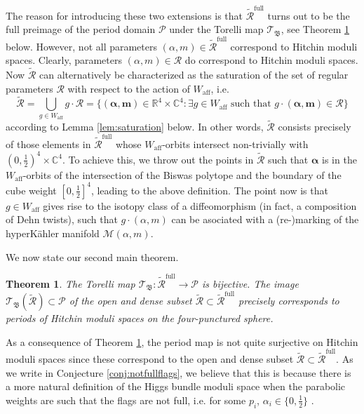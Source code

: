 \documentclass[12pt,letterpaper,reqno]{amsart}
\def\bm#1{#1}%
\def\mathbf#1{#1}%
\newtheorem{thm}{Theorem}
\theoremstyle{remark}
\theoremstyle{definition}
\numberwithin{thm}{section}
\numberwithin{equation}{section}
\numberwithin{figure}{section}
\newcommand{\fB}{{\mathfrak B}}
\newcommand{\cT}{\ensuremath{\mathcal T}}
\newcommand{\R}{\ensuremath{\mathbb R}}
\newcommand{\C}{\ensuremath{\mathbb C}}
\newcommand{\bfalpha}{\ensuremath{\bm \alpha}}
\newcommand{\calP}{\mathcal P}
\newcommand{\calM}{\mathcal M}
\newcommand{\aff}{\mathrm{aff}}
\newcommand{\bfm}{\mathbf{m}}
\begin{document}
The reason for introducing these two extensions is that $\widetilde{\mathcal{R}}^{\mathrm{full}}$ turns out to be the full preimage of the period domain $\mathcal{P}$ under the Torelli map $\mathcal{T}_\mathfrak{B}$, see Theorem \ref{thm:surjective} below. However, not all parameters $(\bfalpha, \bfm) \in \widetilde{\mathcal{R}}^{\mathrm{full}}$ correspond to Hitchin moduli spaces. Clearly, parameters $(\bfalpha, \bfm) \in \mathcal{R}$ do correspond to Hitchin moduli spaces. Now $\widetilde{\mathcal{R}}$ can alternatively be characterized as the saturation of the set of regular parameters $\mathcal{R}$ with respect to the action of $W_\aff$, i.e.\
\[
\widetilde{\mathcal{R}} = \bigcup_{g \in 	W_{\mathrm{aff}}} g \cdot \mathcal{R} = \bigl \{ (\boldsymbol{\alpha}, \textbf{m}) \in \R^4 \times \C^4 : \exists g \in W_{\mathrm{aff}} \mbox{ such that } g \cdot (\boldsymbol{\alpha}, \textbf{m}) \in \mathcal{R} \bigr\}
\]
according to Lemma \ref{lem:saturation} below. In other words, $\widetilde{\mathcal{R}}$ consists precisely of those elements in $\widetilde{\mathcal{R}}^{\mathrm{full}}$ whose $W_{\mathrm{aff}}$-orbits intersect non-trivially with $(0, \frac{1}{2})^4 \times \C^4$. To achieve this, we throw out the points in $\widetilde{\mathcal{R}}$ such that $\boldsymbol{\alpha}$ is in the $W_{\mathrm{aff}}$-orbits of the intersection of the Biswas polytope and the boundary of the cube weight $[ 0, \frac{1}{2}]^4$, leading to the above definition. The point now is that $g \in W_\aff$ gives rise to the isotopy class of a diffeomorphism (in fact, a composition of Dehn twists), such that $g \cdot (\bfalpha, \bfm)$ can be asociated with a (re-)marking of the hyperK\"ahler manifold $\calM(\bfalpha, \bfm)$.

\smallskip

We now state our second main theorem.

\begin{thm}\label{thm:surjective}
The Torelli map $\cT_\fB: \widetilde{\mathcal{R}}^{\mathrm{full}} \to \calP$ is bijective. The image $\mathcal{T}_{\mathfrak{B}}(\widetilde{\mathcal{R}})\subset \calP$ of the open and dense subset $\widetilde{\mathcal{R}}\subset \widetilde{\mathcal{R}}^{\mathrm{full}}$ precisely corresponds to periods of Hitchin moduli spaces on the four-punctured sphere.
\end{thm}

As a consequence of Theorem \ref{thm:surjective}, the period map is not quite surjective on Hitchin moduli spaces since these correspond to the open and dense subset $\widetilde{\mathcal{R}} \subset \widetilde{\mathcal{R}}^{\mathrm{full}}$. As we write in Conjecture \ref{conj:notfullflags}, we believe that this is because there is a more natural definition of the Higgs bundle moduli space when the parabolic weights are such that the flags are not full, i.e. for some $p_i$, $\alpha_i \in \{0, \frac{1}{2}\}$ .
\end{document}
